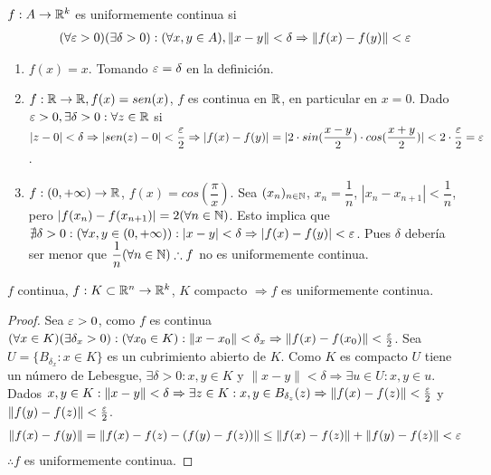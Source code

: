 \begin{definition}
  $f: A \to \mathbb{R}^k$ es uniformemente continua si \begin{align*}
    (\forall \varepsilon > 0)(\exists \delta > 0) : (\forall x,y \in A), \|x-y\| < \delta \Rightarrow \|f(x) - f(y)\| < \varepsilon
  \end{align*}
\end{definition}

\clearpage

\begin{eg}
  \begin{enumerate}
    \item $f(x) = x$. Tomando $\varepsilon = \delta$ en la definición.
    \item $f: \mathbb{R} \to \mathbb{R}, f(x) = sen(x)$, $f$ es continua en $\mathbb{R}$, en particular en $x = 0$. Dado $\varepsilon > 0, \exists \delta > 0 : \forall z \in \mathbb{R}$ si $|z-0| < \delta \Rightarrow |sen(z) - 0| < \dfrac{\varepsilon}{2} \Rightarrow |f(x) - f(y)| = |2 \cdot sin(\dfrac{x-y}{2}) \cdot cos(\dfrac{x+y}{2})| < 2 \cdot \dfrac{\varepsilon}{2} = \varepsilon$.
    \item $f: (0, +\infty) \to \mathbb{R}$, $f(x) = cos(\dfrac{\pi}{x})$. Sea $(x_n)_{n \in \mathbb{N}}$, $x_n = \dfrac{1}{n}$, $|x_n - x_{n+1}| < \dfrac{1}{n}$, pero $|f(x_n) - f(x_{n+1})| = 2 (\forall n \in \mathbb{N})$. Esto implica que $\nexists \delta > 0 : (\forall x,y \in (0, +\infty)) : |x-y| < \delta \Rightarrow |f(x) - f(y)| < \varepsilon$. Pues $\delta$ debería ser menor que $\dfrac{1}{n} (\forall n \in \mathbb{N}) \therefore f$ no es uniformemente continua.
  \end{enumerate}
\end{eg}

\begin{theorem}
  $f$ continua, $f: K \subset \mathbb{R}^n \to \mathbb{R}^k$, $K$ compacto $\Rightarrow f$ es uniformemente continua.
  \begin{proof}
    Sea $\varepsilon > 0$, como $f$ es continua $(\forall x \in K)(\exists \delta_x > 0) : (\forall x_0 \in K) : \|x - x_0\| < \delta_x \Rightarrow \|f(x) - f(x_0)\| < \frac{\varepsilon}{2}$. Sea $U = \{B_{\delta_x} : x \in K\}$ es un cubrimiento abierto de $K$. Como $K$ es compacto $U$ tiene un número de Lebesgue, $\exists \delta > 0 : x, y \in K$ y $ \|x-y\| < \delta \Rightarrow \exists u \in U : x, y \in u$. Dados $x, y \in K : \|x-y\| < \delta \Rightarrow \exists z \in K : x, y \in B_{\delta_z}(z) \Rightarrow \|f(x) - f(z)\| < \frac{\varepsilon}{2}$ y $\|f(y) - f(z)\| < \frac{\varepsilon}{2}$.
    \begin{align*}
      \|f(x) - f(y)\| = \|f(x) - f(z) - (f(y) - f(z))\| \leq \|f(x) - f(z)\| + \|f(y) - f(z)\| < \varepsilon
    \end{align*} $\therefore f$ es uniformemente continua.
  \end{proof}
\end{theorem}

